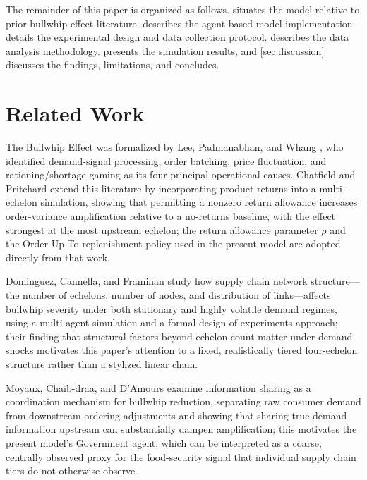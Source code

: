\documentclass[final,onefignum,onetabnum]{siuro250211}
\begin{document}
The remainder of this paper is organized as follows.  situates the model
relative to prior bullwhip effect literature.  describes the agent-based model
implementation.  details the experimental design and data collection
protocol.  describes the data analysis methodology.  presents
the simulation results, and \cref{sec:discussion} discusses the findings, limitations, and
concludes.

\section{Related Work}
\label{sec:related}

The Bullwhip Effect was formalized by Lee, Padmanabhan, and Whang \cite{LeePadmanabhanWhang1997},
who identified demand-signal processing, order batching, price fluctuation, and rationing/shortage
gaming as its four principal operational causes. Chatfield and Pritchard
\cite{ChatfieldPritchard2013} extend this literature by incorporating product returns into a
multi-echelon simulation, showing that permitting a nonzero return allowance increases
order-variance amplification relative to a no-returns baseline, with the effect strongest at the
most upstream echelon; the return allowance parameter $\rho$ and the Order-Up-To replenishment
policy used in the present model are adopted directly from that work.

Dominguez, Cannella, and Framinan \cite{DominguezCannellaFraminan2015} study how supply chain
network structure---the number of echelons, number of nodes, and distribution of links---affects
bullwhip severity under both stationary and highly volatile demand regimes, using a multi-agent
simulation and a formal design-of-experiments approach; their finding that structural factors
beyond echelon count matter under demand shocks motivates this paper's attention to a fixed,
realistically tiered four-echelon structure rather than a stylized linear chain.

Moyaux, Chaib-draa, and D'Amours \cite{MoyauxChaibdraaDamours2007} examine information sharing as
a coordination mechanism for bullwhip reduction, separating raw consumer demand from
downstream ordering adjustments and showing that sharing true demand information upstream can
substantially dampen amplification; this motivates the present model's Government agent, which
can be interpreted as a coarse, centrally observed proxy for the food-security signal that
individual supply chain tiers do not otherwise observe.
\end{document}
